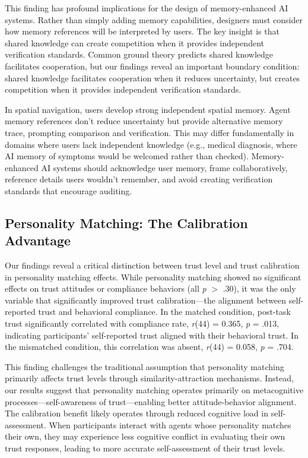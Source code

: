 \documentclass[12pt]{article}
\begin{document}
This finding has profound implications for the design of memory-enhanced AI systems. Rather than simply adding memory capabilities, designers must consider how memory references will be interpreted by users. The key insight is that shared knowledge can create competition when it provides independent verification standards. Common ground theory \citep{clark1991grounding} predicts shared knowledge facilitates cooperation, but our findings reveal an important boundary condition: shared knowledge facilitates cooperation when it reduces uncertainty, but creates competition when it provides independent verification standards.

In spatial navigation, users develop strong independent spatial memory. Agent memory references don't reduce uncertainty but provide alternative memory trace, prompting comparison and verification. This may differ fundamentally in domains where users lack independent knowledge (e.g., medical diagnosis, where AI memory of symptoms would be welcomed rather than checked). Memory-enhanced AI systems should acknowledge user memory, frame collaboratively, reference details users wouldn't remember, and avoid creating verification standards that encourage auditing.

\subsection{Personality Matching: The Calibration Advantage}

Our findings reveal a critical distinction between trust level and trust calibration in personality matching effects. While personality matching showed no significant effects on trust attitudes or compliance behaviors (all \textit{p} $>$ .30), it was the only variable that significantly improved trust calibration—the alignment between self-reported trust and behavioral compliance. In the matched condition, post-task trust significantly correlated with compliance rate, \textit{r}(44) = 0.365, \textit{p} = .013, indicating participants' self-reported trust aligned with their behavioral trust. In the mismatched condition, this correlation was absent, \textit{r}(44) = 0.058, \textit{p} = .704.

This finding challenges the traditional assumption that personality matching primarily affects trust levels through similarity-attraction mechanisms. Instead, our results suggest that personality matching operates primarily on metacognitive processes—self-awareness of trust—enabling better attitude-behavior alignment. The calibration benefit likely operates through reduced cognitive load in self-assessment. When participants interact with agents whose personality matches their own, they may experience less cognitive conflict in evaluating their own trust responses, leading to more accurate self-assessment of their trust levels.
\end{document}
